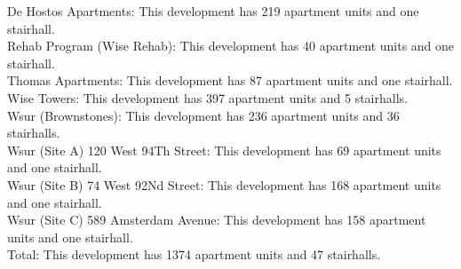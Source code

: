 {De Hostos Apartments}: This development has 219 apartment units and one stairhall.\\{Rehab Program (Wise Rehab)}: This development has 40 apartment units and one stairhall.\\{Thomas Apartments}: This development has 87 apartment units and one stairhall.\\{Wise Towers}: This development has 397 apartment units and 5 stairhalls.\\{Wsur (Brownstones)}: This development has 236 apartment units and 36 stairhalls.\\{Wsur (Site A) 120 West 94Th Street}: This development has 69 apartment units and one stairhall.\\{Wsur (Site B) 74 West 92Nd Street}: This development has 168 apartment units and one stairhall.\\{Wsur (Site C) 589 Amsterdam Avenue}: This development has 158 apartment units and one stairhall.\\{Total}: This development has 1374 apartment units and 47 stairhalls.\\
